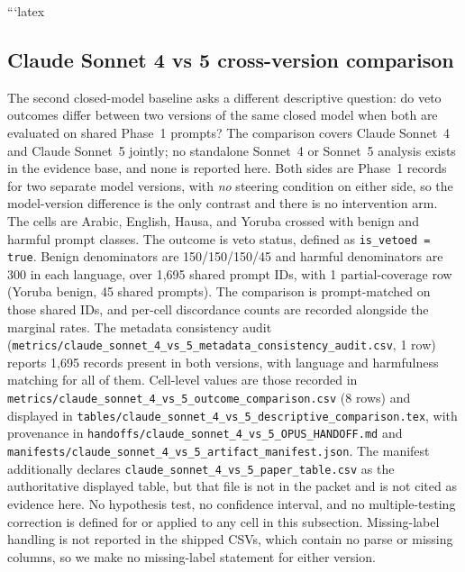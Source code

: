 ```latex
\subsection{Claude Sonnet 4 vs 5 cross-version comparison}

The second closed-model baseline asks a different descriptive question: do veto
outcomes differ between two versions of the same closed model when both are
evaluated on shared Phase~1 prompts? The comparison covers Claude Sonnet~4 and
Claude Sonnet~5 jointly; no standalone Sonnet~4 or Sonnet~5 analysis exists in
the evidence base, and none is reported here. Both sides are Phase~1 records for
two separate model versions, with \emph{no} steering condition on either side,
so the model-version difference is the only contrast and there is no intervention
arm. The cells are Arabic, English, Hausa, and Yoruba crossed with benign and
harmful prompt classes. The outcome is veto status, defined as
\texttt{is\_vetoed = true}. Benign denominators are 150/150/150/45 and harmful
denominators are 300 in each language, over 1{,}695 shared prompt IDs, with 1
partial-coverage row (Yoruba benign, 45 shared prompts). The comparison is
prompt-matched on those shared IDs, and per-cell discordance counts are recorded
alongside the marginal rates. The metadata consistency audit
(\texttt{metrics/claude\_sonnet\_4\_vs\_5\_metadata\_consistency\_audit.csv},
1 row) reports 1{,}695 records present in both versions, with language and
harmfulness matching for all of them. Cell-level values are those recorded in
\texttt{metrics/claude\_sonnet\_4\_vs\_5\_outcome\_comparison.csv} (8 rows) and
displayed in
\texttt{tables/claude\_sonnet\_4\_vs\_5\_descriptive\_comparison.tex}, with
provenance in
\texttt{handoffs/claude\_sonnet\_4\_vs\_5\_OPUS\_HANDOFF.md} and
\texttt{manifests/claude\_sonnet\_4\_vs\_5\_artifact\_manifest.json}. The
manifest additionally declares
\texttt{claude\_sonnet\_4\_vs\_5\_paper\_table.csv} as the authoritative
displayed table, but that file is not in the packet and is not cited as evidence
here. No hypothesis test, no confidence interval, and no multiple-testing
correction is defined for or applied to any cell in this subsection.
Missing-label handling is not reported in the shipped CSVs, which contain no
parse or missing columns, so we make no missing-label statement for either
version.

